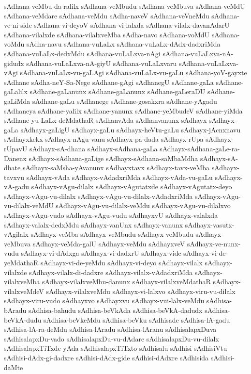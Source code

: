 {sAdhana-veMbu-da-ralilx
sAdhana-veMbudu
sAdhana-veMbuva
sAdhana-veMdU
sAdhana-veMdare
sAdhana-veMdu
sAdha-naveV
sAdhana-veVneMdu
sAdhana-ve-ni-side
sAdhana-vi-deyoV
sAdhana-vi-lalxda
sAdhana-vilalx-davanAdarU
sAdhana-vilalxde
sAdhana-vilalxveMba
sAdha-navo
sAdhana-voMdU
sAdhana-voMdu
sAdha-navu
sAdhana-vuLaLx
sAdhana-vuLaLx-dAdx-dadxriMda
sAdhana-vuLaLx-dedxMdu
sAdhana-vuLaLxva-nAgi
sAdhana-vuLaLxva-nA-gidudx
sAdhana-vuLaLxva-nA-giyU
sAdhana-vuLaLxvaru
sAdhana-vuLaLxva-vAgi
sAdhana-vuLaLx-vu-gaLAgi
sAdhana-vuLaLx-vu-gaLu
sAdhana-yoV-gayxte
sAdhane
sAdha-neY-Sa-Nege
sAdhane-gAgi
sAdhanegU
sAdhane-gaLa
sAdhane-gaLalilx
sAdhane-gaLanunx
sAdhane-gaLanunx
sAdhane-gaLeraDU
sAdhane-gaLiMda
sAdhane-gaLu
sAdhanege
sAdhane-gosakxra
sAdhane-yAgadu
sAdhaneya
sAdhane-yalilx
sAdhane-yanunx
sAdhane-yeMbudeV
sAdhane-yiMda
sAdhane-yu-LaLx-deMdathaR
sAdhanvAda
sAdhanvanunx
sAdhayx
sAdhayx-gaLa
sAdhayx-gaLigU
sAdhayx-gaLu
sAdhayx-heVtu-gaLu
sAdhayx-jAcnxnavu
sAdhayxkekx
sAdhayx-nAgu-vanu
sAdhayx-pa-dada
sAdhayx-rUpa
sAdhayx-rUpavU
sAdhayx-sA-dhana
sAdhayx-sAdhana-gaLa
sAdhayx-sAdhana-gaLe-ra-Danenx
sAdhayx-sAdhana-gaLige
sAdhayx-sAdhana-saMbaMdha
sAdhayx-sA-dhate
sAdhayx-saMsha-yAvanunx
sAdhayxtavx
sAdhayx-tavx-veMba
sAdhayx-tavxvu
sAdhayx-vAda
sAdhayx-vAdadxriMda
sAdhayx-vAda-vu-gaLu
sAdhayx-vA-gadu
sAdhayx-vAgu-dilalx
sAdhayx-vAgutatxde
sAdhayx-vAgutatx-deyo
sAdhayx-vAgu-vu-dilalx
sAdhayx-vAgu-vu-dilalx-vAdadxriMda
sAdhayx-vAgu-vu-dilalx-veMdU
sAdhayx-vAgu-vu-dilalx-veMdu
sAdhayx-vAgu-vu-dilalxvo
sAdhayx-vAgu-vudo
sAdhayx-vAgu-vudu
sAdhayxvU
sAdhayx-valalxda
sAdhayx-valalx-dedxMdu
sAdhayx-vanUnx
sAdhayx-vanunx
sAdhayx-vasutx-vAgilalx
sAdhayx-veMba
sAdhayx-veMbudu
sAdhayx-veMbudu
sAdhayx-veMbuva
sAdhayx-veMda-galU
sAdhayx-veMdu
sAdhayxveV
sAdhayx-ve-nunx-vudu
sAdhayx-vi-dAdxga
sAdhayx-vi-dadxrU
sAdhayx-vide
sAdhayx-vi-de-yeMdathaR
sAdhayx-vi-de-yeMdu
sAdhayx-vi-deyo
sAdhayx-vilalx
sAdhayx-vilalxde
sAdhayx-vilalx-di-dadxre
sAdhayx-vilalx-vAdadxriMda
sAdhayx-vilalxveMba
sAdhayx-vilalxveMbu-danunx
sAdhayx-vilalxveMdathaR
sAdhayx-vilalxveMdeV
sAdhayx-vilalxveMdu
sAdhayx-vi-lalxvo
sAdhayx-viru-vu-dilalx
sAdhayx-viru-vudo
sAdhayxvo
sAdhayxvu
sAdhayx-vui-lalx-veMdu
sAdhisa-bAradu
sAdhisa-bahudu
sAdhisa-beVkAda
sAdhisa-beVkA-dadudx
sAdhisa-beVkA-dudu
sAdhisa-beVkeMdu
sAdhisa-beVku
sAdhisade
sAdhisa-lA-gadu
sAdhisa-lA-ra-deMdu
sAdhisa-lAradu
sAdhisa-lAranu
sAdhisalapxDuva
sAdhisalapxDu-vado
sAdhisalapxDu-vu-dAdare
sAdhisalapxDu-vu-dilalx
sAdhisalapxTiTxde-yAda
sAdhisalapxTiTxto
sAdhisalu
sAdhisi
sAdhisiVtu
sAdhisi-dAdx-gi-dadxre
sAdhisi-dAdx-gide
sAdhisi-dAdxre
sAdhisida
sAdhisi-daMte
}
